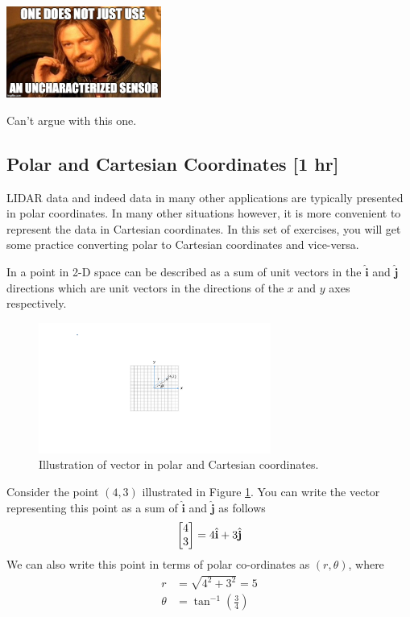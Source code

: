\documentclass[M3_Night5_Solutions]{subfiles}
\begin{document}
\begin{marginfigure}
\includegraphics[width=2in]{figs/sensor}
\caption{Can't argue with this one.}
\end{marginfigure}

\subsection{Polar and Cartesian Coordinates [1 hr]}
LIDAR data and indeed data in many other applications are typically presented in polar coordinates. In many other situations however, it is more convenient to represent the data in Cartesian coordinates. In this set of exercises, you will get some practice converting polar to Cartesian coordinates and vice-versa.

In a point in 2-D space can be described as a sum of unit vectors in the $\hat{\mathbf{i}}$ and $\hat{\mathbf{j}}$ directions which are unit vectors in the directions of the $x$ and $y$ axes respectively.

\begin{figure}
\includegraphics[width=3in]{figs/PolarCartesianVector43.pdf}
\caption{Illustration of vector in polar and Cartesian coordinates.}
\label{fig:VecRotation}
\end{figure}

Consider the point $(4,3)$ illustrated in Figure \ref{fig:VecRotation}.  You can write the vector representing this point as a sum of $\hat{\mathbf {i}}$ and $\hat{\mathbf{j}}$ as follows
\begin{align}
\begin{bmatrix} 4 \\ 3 \end{bmatrix} = 4\hat{\mathbf{i}} + 3\hat{\mathbf{j}}
\end{align}
We can also write this point in terms of polar co-ordinates as $(r, \theta)$, where
\begin{align}
r &= \sqrt{4^2+3^2} = 5\\
\theta &= \tan^{-1}\left(\frac34\right)
\end{align}
\end{document}
